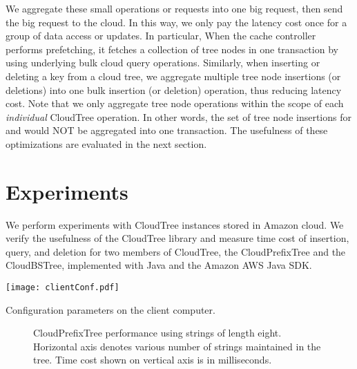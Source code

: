 \documentclass[10pt, conference, compsocconf]{IEEEtran}
\begin{document}
We aggregate these small operations or requests into one big request, then send the big request to the cloud.
In this way, we only pay the latency cost once for a group of data access or updates.  In particular,
When the cache controller performs prefetching, it fetches a collection of tree nodes in one transaction by using
underlying bulk cloud query operations. Similarly, when inserting or deleting a key from a cloud tree,
we aggregate multiple tree node insertions (or deletions) into one bulk insertion (or deletion) operation, thus reducing latency cost.
Note that we only aggregate tree node operations within the scope of each \emph{individual} CloudTree operation. In other words, the set of
tree node insertions for  and  would NOT be aggregated into one transaction.
The usefulness of these optimizations are evaluated in the next section.

\section{Experiments}
\label{tests}
We perform experiments with CloudTree instances stored in Amazon cloud. 
We verify the usefulness of the CloudTree library and 
measure time cost of insertion, query, and deletion for
two members of CloudTree, the CloudPrefixTree and the CloudBSTree, implemented 
with Java and the Amazon AWS Java SDK.

\begin{table}[t]
\begin{center}
\texttt{[image: clientConf.pdf]}
\caption{Configuration parameters on the client computer. }
\label{fig:config}
\end{center}
\end{table}



\begin{figure}[t]
\centering
{}
   \hspace{-1\baselineskip}
    \hspace{-1\baselineskip}
   \label{fig:trie8}
 \caption[Optional caption for list of figures]{CloudPrefixTree performance using strings of length eight.
  Horizontal axis denotes various number of strings maintained in the tree. Time cost shown on vertical axis is in milliseconds.
}
\label{fig:trie8}
\end{figure}
\end{document}
